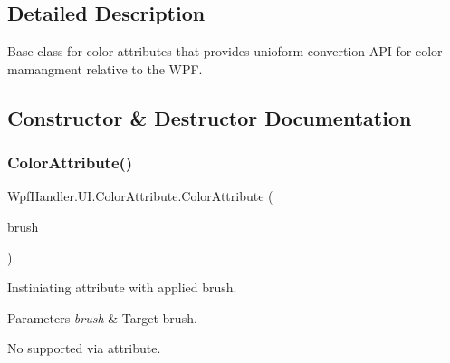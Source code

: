 \subsection{Detailed Description}
Base class for color attributes that provides unioform convertion A\+PI for color mamangment relative to the W\+PF. 



\subsection{Constructor \& Destructor Documentation}
\mbox{\label{class_wpf_handler_1_1_u_i_1_1_color_attribute_a55398dce3088472e741cfa5682090e4f}} 
\subsubsection{\texorpdfstring{Color\+Attribute()}{ColorAttribute()}\hspace{0.1cm}{\footnotesize\ttfamily [1/4]}}
{\footnotesize\ttfamily Wpf\+Handler.\+U\+I.\+Color\+Attribute.\+Color\+Attribute (\begin{DoxyParamCaption}\item[{\mbox{\hyperlink{class_wpf_handler_1_1_u_i_1_1_color_attribute_afa14c4542d8023b3ddad6aba74993877}{Brush}}}]{brush }\end{DoxyParamCaption})}



Instiniating attribute with applied brush. 


\begin{DoxyParams}{Parameters}
{\em brush} & Target brush.\\
\hline
\end{DoxyParams}


No supported via attribute.\mbox{\label{class_wpf_handler_1_1_u_i_1_1_color_attribute_a5a07f18b18eff772c26e484a764b38f3}} 
